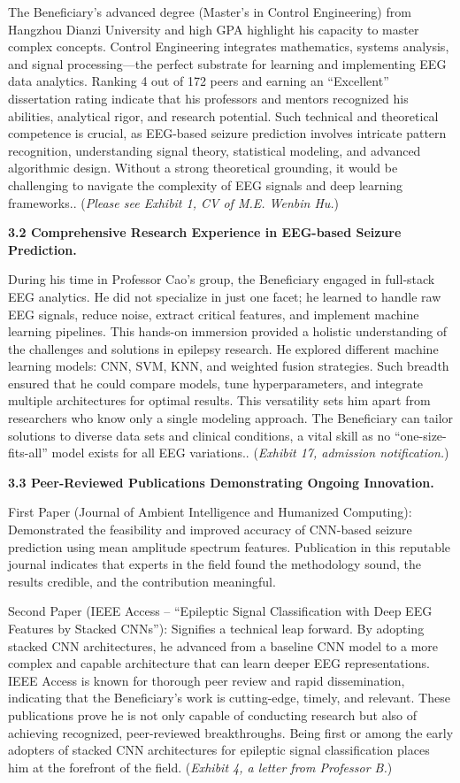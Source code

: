 \documentclass{article}
\begin{document}
The Beneficiary’s advanced degree (Master’s in Control Engineering) from Hangzhou Dianzi University and high GPA highlight his capacity to master complex concepts. Control Engineering integrates mathematics, systems analysis, and signal processing—the perfect substrate for learning and implementing EEG data analytics. Ranking 4 out of 172 peers and earning an “Excellent” dissertation rating indicate that his professors and mentors recognized his abilities, analytical rigor, and research potential.
Such technical and theoretical competence is crucial, as EEG-based seizure prediction involves intricate pattern recognition, understanding signal theory, statistical modeling, and advanced algorithmic design. Without a strong theoretical grounding, it would be challenging to navigate the complexity of EEG signals and deep learning frameworks.. ({\it Please see Exhibit 1, CV of M.E. Wenbin Hu.}) 

{\bf 3.2 Comprehensive Research Experience in EEG-based Seizure Prediction.}

During his time in Professor Cao’s group, the Beneficiary engaged in full-stack EEG analytics. He did not specialize in just one facet; he learned to handle raw EEG signals, reduce noise, extract critical features, and implement machine learning pipelines. This hands-on immersion provided a holistic understanding of the challenges and solutions in epilepsy research.
He explored different machine learning models: CNN, SVM, KNN, and weighted fusion strategies. Such breadth ensured that he could compare models, tune hyperparameters, and integrate multiple architectures for optimal results. This versatility sets him apart from researchers who know only a single modeling approach. The Beneficiary can tailor solutions to diverse data sets and clinical conditions, a vital skill as no “one-size-fits-all” model exists for all EEG variations.. ({\it Exhibit 17, admission notification.}) 


{\bf 3.3 Peer-Reviewed Publications Demonstrating Ongoing Innovation.}

First Paper (Journal of Ambient Intelligence and Humanized Computing):
Demonstrated the feasibility and improved accuracy of CNN-based seizure prediction using mean amplitude spectrum features. Publication in this reputable journal indicates that experts in the field found the methodology sound, the results credible, and the contribution meaningful.

Second Paper (IEEE Access – “Epileptic Signal Classification with Deep EEG Features by Stacked CNNs”):
Signifies a technical leap forward. By adopting stacked CNN architectures, he advanced from a baseline CNN model to a more complex and capable architecture that can learn deeper EEG representations. IEEE Access is known for thorough peer review and rapid dissemination, indicating that the Beneficiary’s work is cutting-edge, timely, and relevant.
These publications prove he is not only capable of conducting research but also of achieving recognized, peer-reviewed breakthroughs. Being first or among the early adopters of stacked CNN architectures for epileptic signal classification places him at the forefront of the field. ({\it Exhibit 4, a letter from Professor B.})
\end{document}
